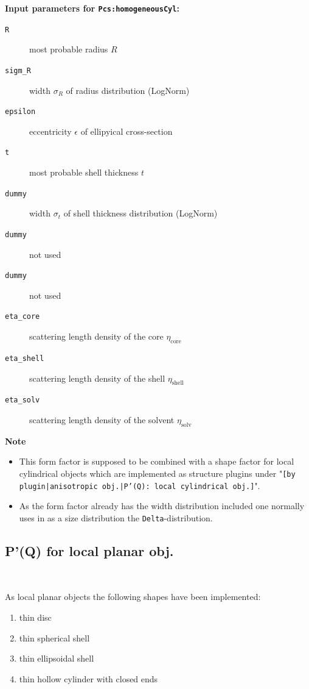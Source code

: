 \noindent
\textbf{Input parameters for \texttt{Pcs:homogeneousCyl}:}
\begin{description}
    \item[\texttt{R}] most probable radius $R$
    \item[\texttt{sigm\_R}] width $\sigma_R$ of radius distribution (LogNorm)
    \item[\texttt{epsilon}] eccentricity $\epsilon$ of ellipyical cross-section
    \item[\texttt{t}] most probable shell thickness $t$
    \item[\texttt{dummy}] width $\sigma_t$ of shell thickness distribution (LogNorm)
    \item[\texttt{dummy}] not used
    \item[\texttt{dummy}] not used
    \item[\texttt{eta\_core}] scattering length density of the core $\eta_\textrm{core}$
    \item[\texttt{eta\_shell}] scattering length density of the shell $\eta_\textrm{shell}$
    \item[\texttt{eta\_solv}] scattering length density of the solvent $\eta_\textrm{solv}$
\end{description}

\noindent
\textbf{Note}
\begin{itemize}
  \item This form factor is supposed to be combined with a shape factor for
local cylindrical objects which are implemented as structure  plugins
under "\texttt{[by plugin|anisotropic obj.|P'(Q): local cylindrical obj.]}".
\item As the form factor already has the width distribution included one normally uses in \SASfit as a size distribution
the \texttt{Delta}-distribution.
\end{itemize}

\clearpage
\subsection{P'(Q) for local planar obj.} ~\\
\label{plugin:Pprime4planar}

As local planar objects the following shapes have been implemented:
\begin{enumerate}
\item thin disc
\item thin spherical shell
\item thin ellipsoidal shell
\item thin hollow cylinder with closed ends
\end{enumerate}

